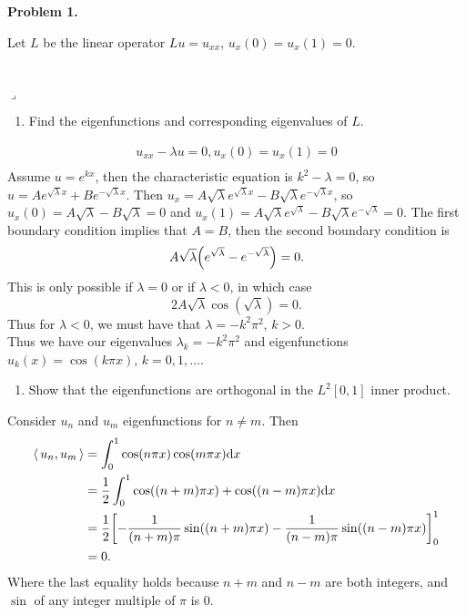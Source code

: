 \documentclass[12pt]{article}
\newcommand{\inpd}[1]{{\left< \, #1 \, \right>}}
\newenvironment{myprob}[1]
    {%
    \noindent{\Huge$\ulcorner$}\textbf{#1.}\begin{em}
    }
    { 
    \end{em} \\ \hphantom{l} \hfill {\Huge$\lrcorner$} }
\begin{document}
\rhead{\today}

{\let\newpage\relax} 


\begin{myprob}{Problem 1}
Let $L$ be the linear operator $Lu = u_{xx}$, $u_x(0)=u_x(1)=0$.
\end{myprob}
\begin{enumerate}[ \ \ (a)]
\item Find the eigenfunctions and corresponding eigenvalues of $L$.
\end{enumerate}
\begin{align*}
u_{xx} - \lambda u = 0, u_x(0)=u_x(1)=0\\
\end{align*}
Assume $u= e^{kx}$, then the characteristic equation is $k^2 - \lambda = 0$, so $u = A e^{\sqrt{\lambda}x} + B e^{-\sqrt{\lambda}x}$.
Then $u_x = A\sqrt{\lambda} e^{\sqrt{\lambda}x} - B\sqrt{\lambda} e^{-\sqrt{\lambda}x}$,
so $u_x(0) = A\sqrt{\lambda} - B\sqrt{\lambda} = 0$
and $u_x(1)= A\sqrt{\lambda} e^{\sqrt{\lambda}} - B\sqrt{\lambda} e^{-\sqrt{\lambda}} = 0$.
The first boundary condition implies that $A=B$, then the second boundary condition is
$$A\sqrt{\lambda}\qty(e^{\sqrt{\lambda}}-e^{-\sqrt{\lambda}}) = 0.$$
This is only possible if $\lambda = 0$ or if $\lambda < 0$, in which case $$2A\sqrt{\lambda}\cos(\sqrt{\lambda})=0.$$
Thus for $\lambda<0$, we must have that $\lambda = -k^2 \pi^2$, $k>0$. \\

\noindent Thus we have our eigenvalues $\lambda_k = -k^2 \pi^2$ and eigenfunctions $u_k(x) = \cos(k\pi x)$, $k=0,1, \dots$.

\begin{enumerate}[ \ \ (b)]
\item Show that the eigenfunctions are orthogonal in the $L^2[0,1]$ inner product.
\end{enumerate}
Consider $u_n$ and $u_m$ eigenfunctions for $n\neq m$.
Then \begin{align*}
\inpd{u_n, u_m} &= \int_0^1 \cos(n \pi x) \cos(m \pi x) \dd x \\
&= \frac{1}{2}\int_0^1 \cos( (n+m) \pi x) + \cos((n-m)\pi x) \dd x \\
&= \frac{1}{2} \qty[ -\frac{1}{(n+m)\pi} \sin((n+m)\pi x) - \frac{1}{(n-m)\pi} \sin((n-m)\pi x)  ]_0^1 \\
&= 0.
\end{align*}
Where the last equality holds because $n+m$ and $n-m$ are both integers, and $\sin$ of any integer multiple of $\pi$ is $0$.
\end{document}
